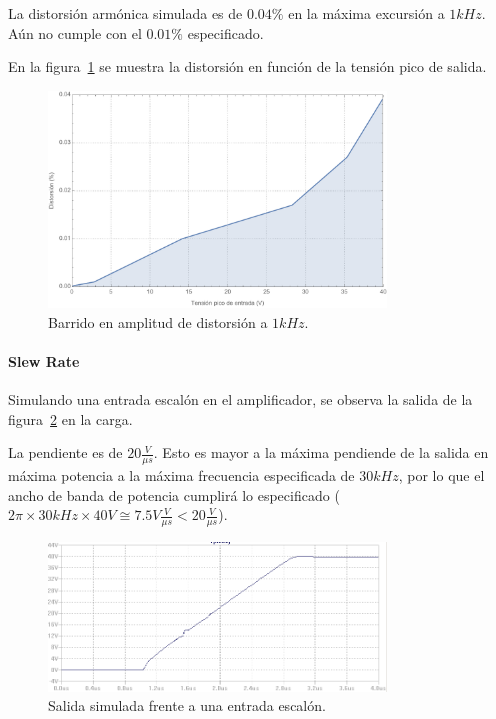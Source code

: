 \documentclass[a4paper,12pt,twoside]{article}
\begin{document}
La distorsión armónica simulada es de $0.04\%$ en la máxima excursión a $1kHz$. Aún no cumple con el $0.01\%$ especificado.


En la figura~\ref{fig:distorsion-barrido} se muestra la distorsión en función de la tensión pico de salida.

\begin{figure}[H]
	\centering
	\includegraphics[width=0.8\textwidth]{img/sim/distorsion-barrido}
	\caption{Barrido en amplitud de distorsión a $1kHz$.}
	\label{fig:distorsion-barrido}
\end{figure}


\paragraph{Slew Rate} Simulando una entrada escalón en el amplificador, se observa la salida de la figura~\ref{fig:slew} en la carga.

La pendiente es de $20 \frac{V}{\mu s}$. Esto es mayor a la máxima pendiende de la salida en máxima potencia a la máxima frecuencia especificada de $30kHz$, por lo que el ancho de banda de potencia cumplirá lo especificado ($2 \pi \times30kHz \times40V\cong 7.5V \frac{V}{\mu s}<20 \frac{V}{\mu s}$).


\begin{figure}[H]
	\centering
	\includegraphics[width=0.8\textwidth]{img/sim/slew}
	\caption{Salida simulada frente a una entrada escalón.}
	\label{fig:slew}
\end{figure}
\end{document}
